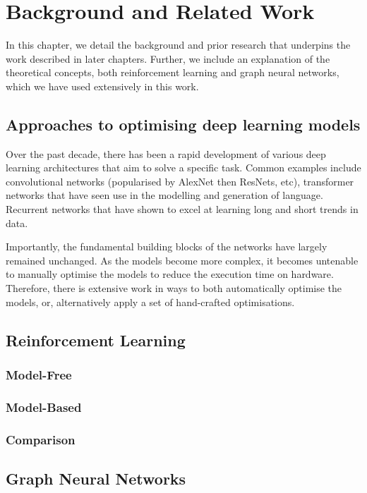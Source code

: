 \chapter{Background and Related Work}
In this chapter, we detail the background and prior research that underpins the work described in later chapters. Further, we include an explanation of the theoretical concepts, both reinforcement learning and graph neural networks, which we have used extensively in this work.

\section{Approaches to optimising deep learning models}
Over the past decade, there has been a rapid development of various deep learning architectures that aim to solve a specific task. Common examples include convolutional networks (popularised by AlexNet then ResNets, etc), transformer networks that have seen use in the modelling and generation of language. Recurrent networks that have shown to excel at learning long and short trends in data.

Importantly, the fundamental building blocks of the networks have largely remained unchanged. As the models become more complex, it becomes untenable to manually optimise the models to reduce the execution time on hardware. Therefore, there is extensive work in ways to both automatically optimise the models, or, alternatively apply a set of hand-crafted optimisations.

\section{Reinforcement Learning}
\subsection{Model-Free}
\subsection{Model-Based}
\subsection{Comparison}

\section{Graph Neural Networks}